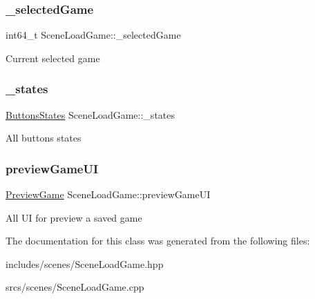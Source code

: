 \subsubsection{\texorpdfstring{\+\_\+selected\+Game}{\_selectedGame}}
{\footnotesize\ttfamily int64\+\_\+t Scene\+Load\+Game\+::\+\_\+selected\+Game\hspace{0.3cm}{\ttfamily [protected]}}

Current selected game \mbox{\label{class_scene_load_game_a5bb4d0eb575c4dcb4a1202da3cb258e2}} 
\subsubsection{\texorpdfstring{\+\_\+states}{\_states}}
{\footnotesize\ttfamily \hyperlink{struct_scene_load_game_1_1_buttons_states}{Buttons\+States} Scene\+Load\+Game\+::\+\_\+states\hspace{0.3cm}{\ttfamily [protected]}}

All buttons states \mbox{\label{class_scene_load_game_a8f699898c6745b601e502c647e49fb75}} 
\subsubsection{\texorpdfstring{preview\+Game\+UI}{previewGameUI}}
{\footnotesize\ttfamily \hyperlink{struct_scene_load_game_1_1_preview_game}{Preview\+Game} Scene\+Load\+Game\+::preview\+Game\+UI\hspace{0.3cm}{\ttfamily [protected]}}

All UI for preview a saved game 

The documentation for this class was generated from the following files\+:\begin{DoxyCompactItemize}
\item 
includes/scenes/Scene\+Load\+Game.\+hpp\item 
srcs/scenes/Scene\+Load\+Game.\+cpp\end{DoxyCompactItemize}
